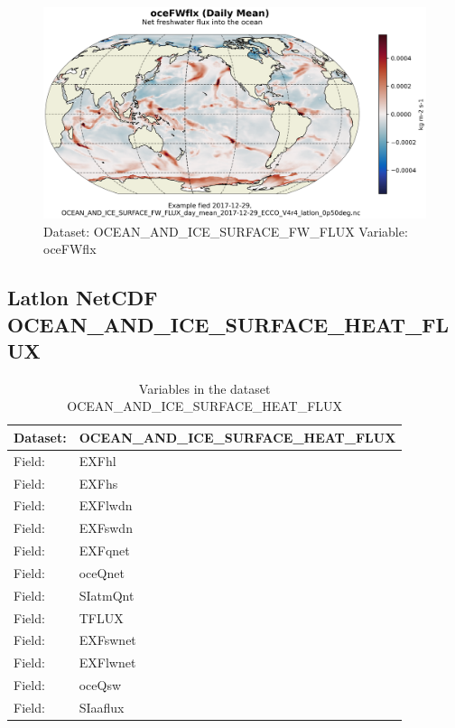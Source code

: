 \begin{figure}[H]
\centering
\includegraphics[scale=0.55]{../images/plots/latlon_plots/Ocean_and_Sea-Ice_Surface_Freshwater_Fluxes/oceFWflx.png}
\caption{Dataset: OCEAN\_AND\_ICE\_SURFACE\_FW\_FLUX Variable: oceFWflx}
\label{tab:table-OCEAN_AND_ICE_SURFACE_FW_FLUX_oceFWflx-Plot}
\end{figure}
\pagebreak
\subsection{Latlon NetCDF OCEAN\_AND\_ICE\_SURFACE\_HEAT\_FLUX}
\newp
\begin{longtable}{|p{}|p{}|}
\caption{Variables in the dataset OCEAN\_AND\_ICE\_SURFACE\_HEAT\_FLUX}
\label{tab:table-OCEAN_AND_ICE_SURFACE_HEAT_FLUX-fields} \\ 
\hline \endhead \hline \endfoot
\rowcolor{lightgray} \textbf{Dataset:} & \textbf{OCEAN\_AND\_ICE\_SURFACE\_HEAT\_FLUX} \\ \hline
Field: &EXFhl \\ \hline
Field: &EXFhs \\ \hline
Field: &EXFlwdn \\ \hline
Field: &EXFswdn \\ \hline
Field: &EXFqnet \\ \hline
Field: &oceQnet \\ \hline
Field: &SIatmQnt \\ \hline
Field: &TFLUX \\ \hline
Field: &EXFswnet \\ \hline
Field: &EXFlwnet \\ \hline
Field: &oceQsw \\ \hline
Field: &SIaaflux \\ \hline
\end{longtable}

